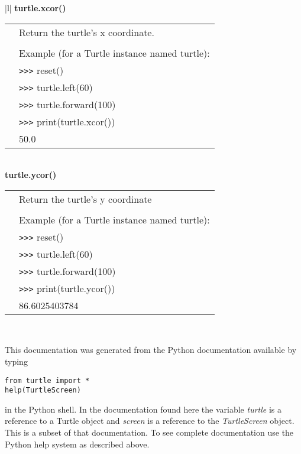\begin{center}
{\begin{tabular}{|l|}
{\bf    turtle.xcor()} \\
   \begin{tabular}{p{0.25in}p{4in}}
&        Return the turtle's x coordinate. \\
&  \\
&        Example (for a Turtle instance named turtle): \\
&        \verb+>+\verb+>+\verb+>+ reset() \\
&        \verb+>+\verb+>+\verb+>+ turtle.left(60) \\
&        \verb+>+\verb+>+\verb+>+ turtle.forward(100) \\
&        \verb+>+\verb+>+\verb+>+ print(turtle.xcor()) \\
&        50.0 \\
\end{tabular} \\ \hline
{\bf    turtle.ycor()} \\
   \begin{tabular}{p{0.25in}p{4in}}
&        Return the turtle's y coordinate \\
&  \\
&        Example (for a Turtle instance named turtle): \\
&        \verb+>+\verb+>+\verb+>+ reset() \\
&        \verb+>+\verb+>+\verb+>+ turtle.left(60) \\
&        \verb+>+\verb+>+\verb+>+ turtle.forward(100) \\
&        \verb+>+\verb+>+\verb+>+ print(turtle.ycor()) \\
&        86.6025403784 \\
\end{tabular} \\ \hline
\end{tabular}}
\end{center}

\label{turtlescreenmethods}
This documentation was generated from the Python documentation available by typing 

\begin{lstlisting}
from turtle import *
help(TurtleScreen)
\end{lstlisting}

\noindent in the Python shell. In the documentation found here the variable {\em turtle} is a  reference to a Turtle object and {\em screen} is a reference to the {\em TurtleScreen} object. This is a subset of that documentation. To see complete documentation use the Python help system as described above. 

